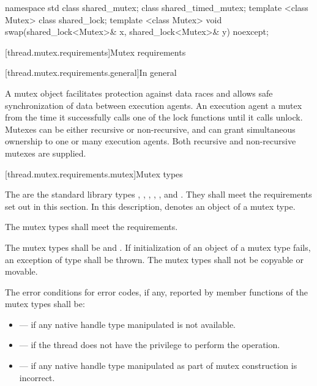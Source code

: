 \begin{codeblock}
namespace std {
  class shared_mutex;
  class shared_timed_mutex;
  template <class Mutex> class shared_lock;
  template <class Mutex>
    void swap(shared_lock<Mutex>& x, shared_lock<Mutex>& y) noexcept;
}
\end{codeblock}

[thread.mutex.requirements]{Mutex requirements}

[thread.mutex.requirements.general]{In general}

\pnum
A mutex object facilitates protection against data races and allows safe synchronization of
data between execution agents.
An execution agent  a mutex from the time it successfully calls one of the
lock functions until it calls unlock. Mutexes can be either recursive or non-recursive, and can
grant simultaneous ownership to one or many execution agents. Both
recursive and non-recursive mutexes are supplied.

[thread.mutex.requirements.mutex]{Mutex types}

\pnum
The  are the standard library types ,
, , ,
, and .
They shall meet the requirements set out in this section. In this description, 
denotes an object of a mutex type.

\pnum
The mutex types shall meet the  requirements.

\pnum
The mutex types shall be  and . If
initialization of an object of a mutex type fails, an exception of type
 shall be thrown. The mutex types shall not be copyable or movable.

\pnum
The error conditions for error codes, if any, reported by member functions of the mutex types
shall be:
\begin{itemize}
\item {} --- if any native handle type manipulated is not available.
\item {} --- if the thread does not have the
privilege to perform the operation.
\item {} --- if any native handle type manipulated as part of mutex
construction is incorrect.
\end{itemize}

